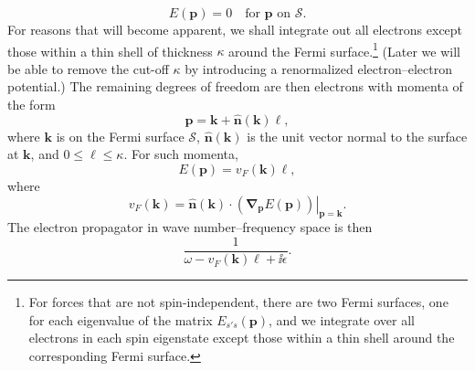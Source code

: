 \begin{equation}
E(\mathbf p)=0\quad\text{for $\mathbf p$ on $\mathcal S$.}
\tag{21.6.38}\label{eq:21.6.38}
\end{equation}
For reasons that will become apparent, we shall integrate out all electrons except those within a thin shell of thickness $\kappa$ around the Fermi surface.\footnote{For forces that are not spin-independent, there are two Fermi surfaces, one for each eigenvalue of the matrix $E_{s's}(\mathbf p)$, and we integrate over all electrons in each spin eigenstate except those within a thin shell around the corresponding Fermi surface.} (Later we will be able to remove the cut-off $\kappa$ by introducing a renormalized electron--electron potential.) The remaining degrees of freedom are then electrons with momenta of the form
\begin{equation}
\mathbf p=\mathbf k+\widehat{\mathbf n}(\mathbf k)\ell,
\tag{21.6.39}\label{eq:21.6.39}
\end{equation}
where $\mathbf k$ is on the Fermi surface $\mathcal S$, $\widehat{\mathbf n}(\mathbf k)$ is the unit vector normal to the surface at $\mathbf k$, and $0\le\ell\le\kappa$. For such momenta,
\begin{equation}
E(\mathbf p)=v_F(\mathbf k)\ell,
\tag{21.6.40}\label{eq:21.6.40}
\end{equation}
where
\begin{equation}
v_F(\mathbf k)=
\left.
\widehat{\mathbf n}(\mathbf k)\cdot
\left(\boldsymbol\nabla_{\mathbf p}E(\mathbf p)\right)
\right|_{\mathbf p=\mathbf k}.
\tag{21.6.41}\label{eq:21.6.41}
\end{equation}
The electron propagator in wave number--frequency space is then
\begin{equation}
\frac{1}{\omega-v_F(\mathbf k)\ell+\ii\epsilon}.
\tag{21.6.42}\label{eq:21.6.42}
\end{equation}

